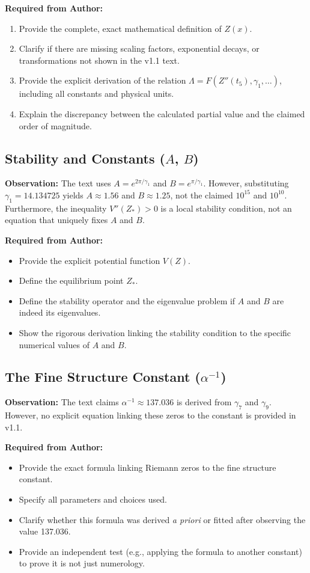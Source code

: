 \documentclass[11pt,a4paper]{article}
\begin{document}
\textbf{Required from Author:}
\begin{enumerate}
    \item Provide the complete, exact mathematical definition of $Z(x)$.
    \item Clarify if there are missing scaling factors, exponential decays, or transformations not shown in the v1.1 text.
    \item Provide the explicit derivation of the relation $\Lambda = F(Z''(t_5), \gamma_1, \dots)$, including all constants and physical units.
    \item Explain the discrepancy between the calculated partial value and the claimed order of magnitude.
\end{enumerate}

\subsection{Stability and Constants ($A$, $B$)}
\textbf{Observation:} The text uses $A = e^{2\pi/\gamma_1}$ and $B = e^{\pi/\gamma_1}$. However, substituting $\gamma_1 = 14.134725$ yields $A \approx 1.56$ and $B \approx 1.25$, not the claimed $10^{15}$ and $10^{10}$. Furthermore, the inequality $V''(Z_*) > 0$ is a local stability condition, not an equation that uniquely fixes $A$ and $B$.

\textbf{Required from Author:}
\begin{itemize}
    \item Provide the explicit potential function $V(Z)$.
    \item Define the equilibrium point $Z_*$.
    \item Define the stability operator and the eigenvalue problem if $A$ and $B$ are indeed its eigenvalues.
    \item Show the rigorous derivation linking the stability condition to the specific numerical values of $A$ and $B$.
\end{itemize}

\subsection{The Fine Structure Constant ($\alpha^{-1}$)}
\textbf{Observation:} The text claims $\alpha^{-1} \approx 137.036$ is derived from $\gamma_7$ and $\gamma_9$. However, no explicit equation linking these zeros to the constant is provided in v1.1.

\textbf{Required from Author:}
\begin{itemize}
    \item Provide the exact formula linking Riemann zeros to the fine structure constant.
    \item Specify all parameters and choices used.
    \item Clarify whether this formula was derived \textit{a priori} or fitted after observing the value 137.036.
    \item Provide an independent test (e.g., applying the formula to another constant) to prove it is not just numerology.
\end{itemize}
\end{document}
